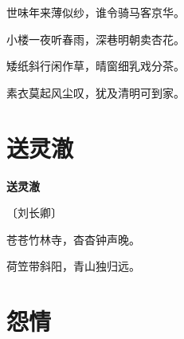 \documentclass[12pt,UTF-8,openany,fontset=none]{ctexbook}
\begin{document}
    \vspace{18pt}  %

\begin{center}
    \begin{Large}

        世味年来薄似纱，谁令骑马客京华。

        小楼一夜听春雨，深巷明朝卖杏花。

        矮纸斜行闲作草，晴窗细乳戏分茶。

        素衣莫起风尘叹，犹及清明可到家。

    \end{Large}

\end{center}

\vspace{8pt}
\clearpage

\section{送灵澈}


\begin{center}
    {\bfseries 送灵澈}

    \vspace{18pt}

    \begin{large}\xuwen
        〔刘长卿〕
    \end{large}

\end{center}

    \vspace{18pt}

\begin{center}
    \begin{Large}

        苍苍竹林寺，杳杳钟声晚。

        荷笠带斜阳，青山独归远。

    \end{Large}

\end{center}

\vspace{8pt}
\clearpage

\section{怨情}

\end{document}
